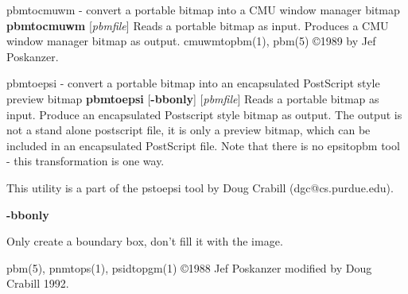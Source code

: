 pbmtocmuwm - convert a portable bitmap into a CMU window manager bitmap
{\bf pbmtocmuwm}
{\rm [}{\it pbmfile}{\rm ]}
Reads a portable bitmap as input.
Produces a CMU window manager bitmap as output.
cmuwmtopbm(1), pbm(5)
\copyright 1989 by Jef Poskanzer.
%
 
%

\newpage
%

pbmtoepsi - convert a portable bitmap into an encapsulated PostScript
style preview bitmap
{\bf pbmtoepsi}
{\rm [}{\bf -bbonly}{\rm ]}
{\rm [}{\it pbmfile}{\rm ]}
Reads a portable bitmap as input.
Produce an encapsulated Postscript style bitmap as output. The output
is not a stand alone postscript file, it is only a preview bitmap,
which can be included in an encapsulated PostScript file.
Note that there is no epsitopbm tool - this transformation is one way.

This utility is a part of the pstoepsi tool by Doug Crabill
(dgc@cs.purdue.edu).
\begin{TPlist}{{\bf -bbonly}}
\item[{{\bf -bbonly}}]
Only create a boundary box, don't fill it with the image.
\end{TPlist}

pbm(5), pnmtops(1), psidtopgm(1)
\copyright 1988 Jef Poskanzer
\nwl
modified by Doug Crabill 1992.
%
 

